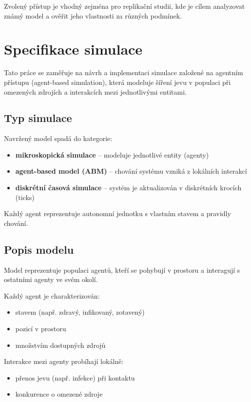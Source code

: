 Zvolený přístup je vhodný zejména pro replikační studii, kde je cílem analyzovat známý model a ověřit jeho vlastnosti za různých podmínek.


\section{Specifikace simulace}

Tato práce se zaměřuje na návrh a implementaci simulace založené na agentním přístupu (agent-based simulation), která modeluje šíření jevu v populaci při omezených zdrojích a interakcích mezi jednotlivými entitami.

\subsection{Typ simulace}

Navržený model spadá do kategorie:

\begin{itemize}
\item \textbf{mikroskopická simulace} -- modeluje jednotlivé entity (agenty)
\item \textbf{agent-based model (ABM)} -- chování systému vzniká z lokálních interakcí
\item \textbf{diskrétní časová simulace} -- systém je aktualizován v diskrétních krocích (ticks)
\end{itemize}

Každý agent reprezentuje autonomní jednotku s vlastním stavem a pravidly chování.

\subsection{Popis modelu}

Model reprezentuje populaci agentů, kteří se pohybují v prostoru a interagují s ostatními agenty ve svém okolí.

Každý agent je charakterizován:
\begin{itemize}
\item stavem (např. zdravý, infikovaný, zotavený)
\item pozicí v prostoru
\item množstvím dostupných zdrojů
\end{itemize}

Interakce mezi agenty probíhají lokálně:
\begin{itemize}
\item přenos jevu (např. infekce) při kontaktu
\item konkurence o omezené zdroje
\end{itemize}

